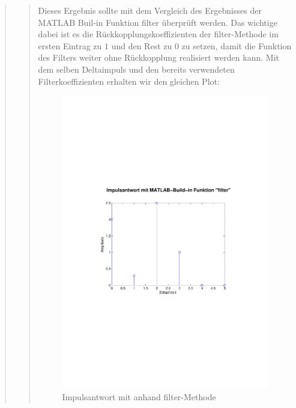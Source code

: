 \begin{quote}
\begin{quote}
	Dieses Ergebnis sollte mit dem Vergleich des Ergebnisses der MATLAB
	Buil-in Funktion filter überprüft werden. Das wichtige dabei ist es die
	Rückkopplungskoeffizienten der filter-Methode im ersten Eintrag zu $1$ und den
	Rest zu $0$ zu setzen, damit die Funktion des Filters weiter ohne Rückkopplung
	realisiert werden kann. Mit dem selben Deltaimpuls und den
	bereits verwendeten Filterkoeffizienten erhalten wir den gleichen Plot:
	
	\begin{figure}[H]
            \centering
                \includegraphics[scale=0.5, trim = 1cm 6cm 1.5cm 8cm,
                clip]{./Bilder/Impulsantwort_aufgabe11}
                    \caption{Impulsantwort mit anhand filter-Methode}
                    \label{fig:./Bilder/Impulsantwort_aufgabe11}
            \end{figure}
            

\end{quote}
\end{quote}
